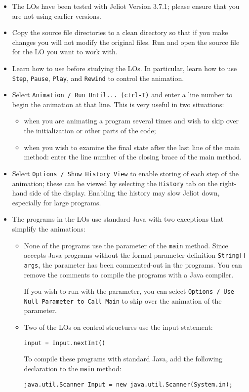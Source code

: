 \begin{itemize}
\item The LOs have been tested with Jeliot Version 3.7.1; please ensure that you
are not using earlier versions.
\item Copy the source file directories to a clean directory so that if you make 
changes you will not modify the original files. 
Run \jel{} and open the source file for the LO you want to work with.
\item Learn how to use \jel{} before studying the LOs.
In particular, learn how to use \texttt{Step}, \texttt{Pause}, \texttt{Play},
and \texttt{Rewind} to control the animation.
\item Select \texttt{Animation / Run Until... (ctrl-T)} and enter a line number to begin
the animation at that line. This is very useful in two situations:
\begin{itemize}
	\item when you are animating a program several times and 
	wish to skip over the initialization or other parts of the code;
	\item when you wish to examine the final state after the last line of the
	main method: enter the line number of the closing brace of the main method.
\end{itemize}
\item Select \texttt{Options / Show History View} to enable storing of each step
of the animation; these can be viewed by selecting the \texttt{History} tab
on the right-hand side of the display. Enabling the history may slow Jeliot down,
especially for large programs.
\item The programs in the LOs use standard Java 
with two exceptions that simplify the animations:
\begin{itemize}
	\item None of the programs use the parameter of the \texttt{main} method.
	Since \jel{} accepts Java programs without the formal parameter 
	definition \texttt{String[] args}, the parameter has been commented-out in the programs.
	You can remove the comments to compile the programs with a Java compiler.
	
	If you wish to run \jel{} with the parameter, you can select \texttt{Options /
	Use Null Parameter to Call Main} to skip over the animation of the parameter.
	\item Two of the LOs on control structures use the input statement:
	\begin{center}
	\texttt{input = Input.nextInt()}
	\end{center}
	To compile these programs with standard Java, 
	add the following declaration to the \texttt{main} method:
    \begin{center}
	\texttt{java.util.Scanner Input = new java.util.Scanner(System.in);}
    \end{center}
\end{itemize}
\end{itemize}

